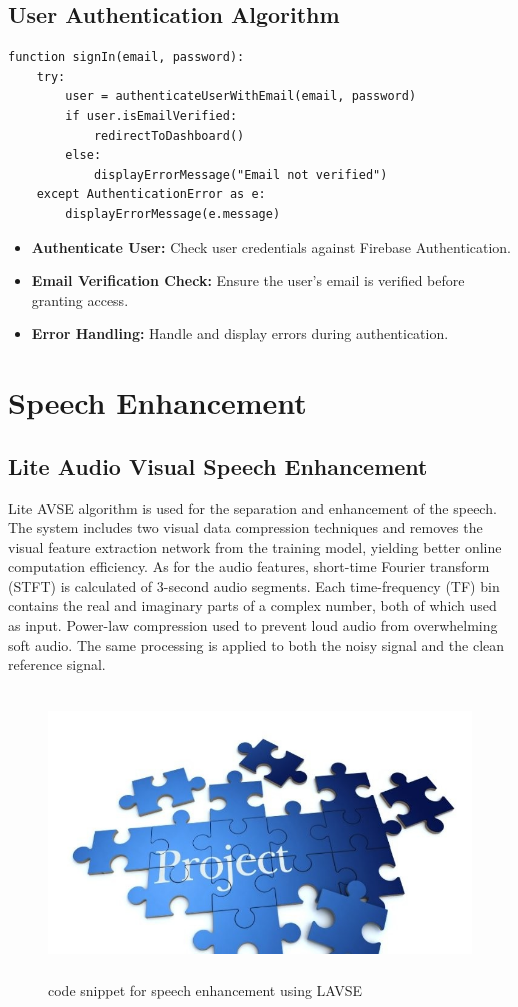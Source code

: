 \documentclass[12pt,a4paper]{report}
\begin{document}
\subsection{User Authentication Algorithm}
\begin{lstlisting}[caption=User Authentication Algorithm]
   function signIn(email, password):
    try:
        user = authenticateUserWithEmail(email, password)
        if user.isEmailVerified:
            redirectToDashboard()
        else:
            displayErrorMessage("Email not verified")
    except AuthenticationError as e:
        displayErrorMessage(e.message)
   \end{lstlisting}
\begin{itemize}
   \item \textbf{Authenticate User:} Check user credentials against Firebase Authentication.
   \item \textbf{Email Verification Check:} Ensure the user’s email is verified before granting access.
   \item \textbf{Error Handling:} Handle and display errors during authentication.
\end{itemize}


\section{Speech Enhancement}
\subsection{Lite Audio Visual Speech Enhancement}
\par
Lite AVSE algorithm is used for the separation and enhancement of the speech. The system 
includes two visual data compression techniques and removes the visual feature extraction 
network from the training model, yielding better online computation efficiency. As for the audio 
features, short-time Fourier transform (STFT) is calculated of 3-second audio segments. Each 
time-frequency (TF) bin contains the real and imaginary parts of a complex number, both of 
which used as input. Power-law compression used to prevent loud audio from overwhelming soft 
audio. The same processing is applied to both the noisy signal and the clean reference signal.

\begin{figure}[hbtp]
\centering
\includegraphics[width=5in,height=3in]{./pic/sample.jpg}
\caption{code snippet for speech enhancement using LAVSE}
\end{figure}
\end{document}
